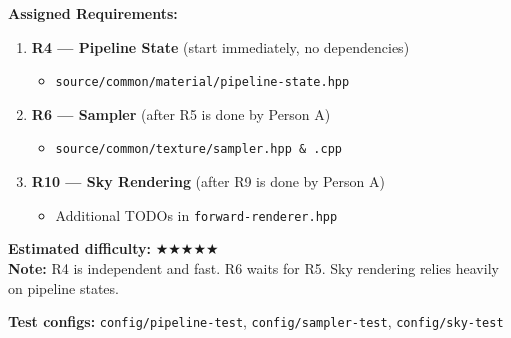 \documentclass[12pt,a4paper]{article}
\begin{document}
\begin{tcolorbox}[
  colback=personC!8, colframe=personC, title={\textbf{Person C} --- Pipeline State + Sampler + Sky Rendering},
  fonttitle=\bfseries\color{white}, coltitle=white
]
\textbf{Assigned Requirements:}
\begin{enumerate}[nosep]
  \item \textbf{R4 --- Pipeline State} (start immediately, no dependencies)
    \begin{itemize}[nosep]
      \item \texttt{source/common/material/pipeline-state.hpp}
    \end{itemize}
  \item \textbf{R6 --- Sampler} (after R5 is done by Person A)
    \begin{itemize}[nosep]
      \item \texttt{source/common/texture/sampler.hpp \& .cpp}
    \end{itemize}
  \item \textbf{R10 --- Sky Rendering} (after R9 is done by Person A)
    \begin{itemize}[nosep]
      \item Additional TODOs in \texttt{forward-renderer.hpp}
    \end{itemize}
\end{enumerate}

\textbf{Estimated difficulty:} {\Large$\bigstar\bigstar\bigstar$}$\bigstar\bigstar$ \\
\textbf{Note:} R4 is independent and fast. R6 waits for R5. Sky rendering relies heavily on pipeline states.

\textbf{Test configs:} \texttt{config/pipeline-test}, \texttt{config/sampler-test}, \texttt{config/sky-test}
\end{tcolorbox}

\vspace{0.3cm}
\end{document}
